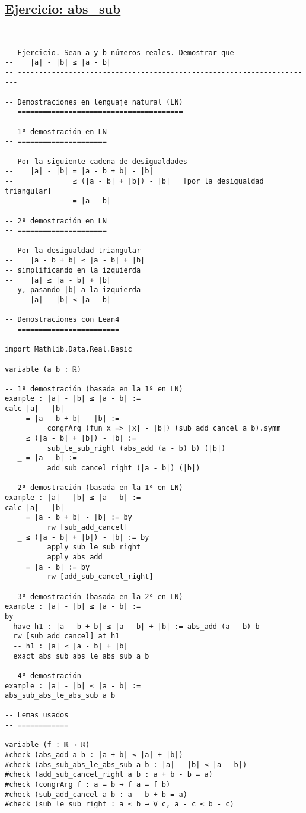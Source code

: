 \subsection{\href{./src/Basicos/abs\_sub.lean}{Ejercicio: abs\_sub}}
\label{sec:org064b698}
\begin{verbatim}
-- ---------------------------------------------------------------------
-- Ejercicio. Sean a y b números reales. Demostrar que
--    |a| - |b| ≤ |a - b|
-- ----------------------------------------------------------------------

-- Demostraciones en lenguaje natural (LN)
-- =======================================

-- 1ª demostración en LN
-- =====================

-- Por la siguiente cadena de desigualdades
--    |a| - |b| = |a - b + b| - |b|
--              ≤ (|a - b| + |b|) - |b|   [por la desigualdad triangular]
--              = |a - b|

-- 2ª demostración en LN
-- =====================

-- Por la desigualdad triangular
--    |a - b + b| ≤ |a - b| + |b|
-- simplificando en la izquierda
--    |a| ≤ |a - b| + |b|
-- y, pasando |b| a la izquierda
--    |a| - |b| ≤ |a - b|

-- Demostraciones con Lean4
-- ========================

import Mathlib.Data.Real.Basic

variable (a b : ℝ)

-- 1ª demostración (basada en la 1ª en LN)
example : |a| - |b| ≤ |a - b| :=
calc |a| - |b|
     = |a - b + b| - |b| :=
          congrArg (fun x => |x| - |b|) (sub_add_cancel a b).symm
   _ ≤ (|a - b| + |b|) - |b| :=
          sub_le_sub_right (abs_add (a - b) b) (|b|)
   _ = |a - b| :=
          add_sub_cancel_right (|a - b|) (|b|)

-- 2ª demostración (basada en la 1ª en LN)
example : |a| - |b| ≤ |a - b| :=
calc |a| - |b|
     = |a - b + b| - |b| := by
          rw [sub_add_cancel]
   _ ≤ (|a - b| + |b|) - |b| := by
          apply sub_le_sub_right
          apply abs_add
   _ = |a - b| := by
          rw [add_sub_cancel_right]

-- 3ª demostración (basada en la 2ª en LN)
example : |a| - |b| ≤ |a - b| :=
by
  have h1 : |a - b + b| ≤ |a - b| + |b| := abs_add (a - b) b
  rw [sub_add_cancel] at h1
  -- h1 : |a| ≤ |a - b| + |b|
  exact abs_sub_abs_le_abs_sub a b

-- 4ª demostración
example : |a| - |b| ≤ |a - b| :=
abs_sub_abs_le_abs_sub a b

-- Lemas usados
-- ============

variable (f : ℝ → ℝ)
#check (abs_add a b : |a + b| ≤ |a| + |b|)
#check (abs_sub_abs_le_abs_sub a b : |a| - |b| ≤ |a - b|)
#check (add_sub_cancel_right a b : a + b - b = a)
#check (congrArg f : a = b → f a = f b)
#check (sub_add_cancel a b : a - b + b = a)
#check (sub_le_sub_right : a ≤ b → ∀ c, a - c ≤ b - c)
\end{verbatim}

